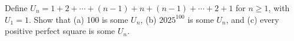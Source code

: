 Define $U_n=1+2+\cdots+(n-1)+n+(n-1)+\cdots+2+1$ for $n\ge1$, with $U_1=1$. Show that (a) 100 is some $U_n$, (b) $2025^{100}$ is some $U_n$, and (c) every positive perfect square is some $U_n$.
